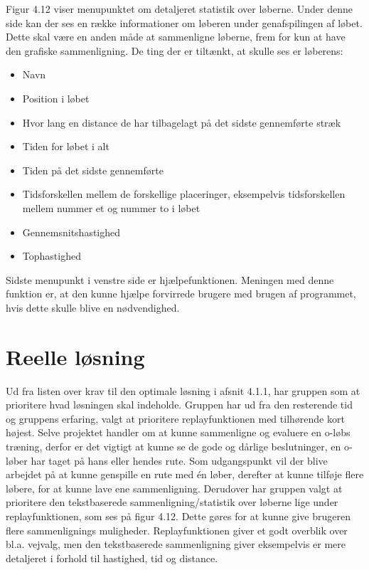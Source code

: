 Figur 4.12 viser menupunktet om detaljeret statistik over løberne. Under denne side kan der ses en række informationer om løberen under genafspilingen af løbet. Dette skal være en anden måde at sammenligne løberne, frem for kun at have den grafiske sammenligning. De ting der er tiltænkt, at skulle ses er løberens:
\begin{itemize}
	\item Navn
	\item Position i løbet
	\item Hvor lang en distance de har tilbagelagt på det sidste gennemførte stræk
	\item Tiden for løbet i alt
	\item Tiden på det sidste gennemførte
	\item Tidsforskellen mellem de forskellige placeringer, eksempelvis tidsforskellen mellem nummer et og nummer to i løbet
	\item Gennemsnitshastighed
	\item Tophastighed
\end{itemize}

Sidste menupunkt i venstre side er hjælpefunktionen. Meningen med denne funktion er, at den kunne hjælpe forvirrede brugere med brugen af programmet, hvis dette skulle blive en nødvendighed.

\section{Reelle løsning}
Ud fra listen over krav til den optimale løsning i afsnit 4.1.1, har gruppen som at prioritere hvad løsningen skal indeholde. Gruppen har ud fra den resterende tid og gruppens erfaring, valgt at prioritere replayfunktionen med tilhørende kort højest. Selve projektet handler om at kunne sammenligne og evaluere en o-løbs træning, derfor er det vigtigt at kunne se de gode og dårlige beslutninger, en o-løber har taget på hans eller hendes rute. Som udgangspunkt vil der blive arbejdet på at kunne genspille en rute med én løber, derefter at kunne tilføje flere løbere, for at kunne lave ene sammenligning. Derudover har gruppen valgt at prioritere den tekstbaserede sammenligning/statistik over løberne lige under replayfunktionen, som ses på figur 4.12. Dette gøres for at kunne give brugeren flere sammenlignings muligheder. Replayfunktionen giver et godt overblik over bl.a. vejvalg, men den tekstbaserede sammenligning giver eksempelvis er mere detaljeret i forhold til hastighed, tid og distance.

